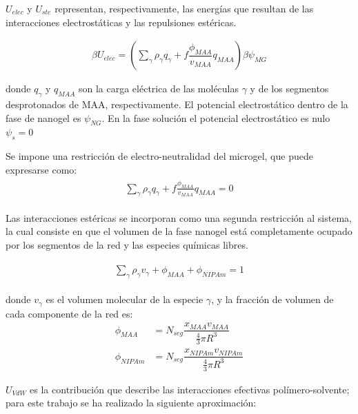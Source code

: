 	
	$U_{elec}$ y $U_{ste}$ representan, respectivamente, las energ\'ias que resultan de las interacciones electrost\'aticas y las repulsiones est\'ericas.
	
	\begin{align}
		\beta U_{elec} =\left(\sum_{\gamma } {\rho_\gamma q_\gamma + f\dfrac{\phi_{MAA}}{v_{MAA}}q_{MAA}}\right)\beta\psi_{MG}
	\end{align}
	
	\noindent donde $q_\gamma$ y $q_{MAA}$ son la carga el\'ectrica de las moléculas $\gamma$ y de los segmentos desprotonados de MAA, respectivamente.
	El potencial electrost\'atico dentro de la fase de nanogel es $\psi_{NG}$. En la fase soluci\'on el potencial electrost\'atico es nulo $\psi_s = 0$
	
	Se impone una restricci\'on de electro-neutralidad del microgel, que puede expresarse como:
	\begin{align}
		\begin{aligned}
			\sum_{\gamma  } \rho_\gamma q_\gamma + f\frac{\phi_{MAA}}{v_{MAA}}q_{MAA}=0
		\end{aligned}
		\label{eq:mc:charge-neutrality}
	\end{align}
	
	Las interacciones est\'ericas se incorporan como una segunda restricci\'on al sistema, la cual consiste en que el volumen de la fase nanogel est\'a completamente ocupado por los segmentos de la red y las especies qu\'imicas libres.
	
	\begin{align}
		\begin{aligned}
			\sum_{\gamma } \rho_\gamma v_\gamma  + \phi_{MAA} + \phi_{NIPAm} = 1
		\end{aligned}
		\label{eq:mc:packing}
	\end{align}
	
	
	\noindent donde $v_\gamma$  es el volumen molecular de la especie $\gamma$, y la fracci\'on de volumen de cada componente de la red es: 
	\begin{align}
		\phi_{MAA}&=N_{seg}\dfrac{x_{MAA}v_{MAA}}{\frac{4}{3}\pi R^3}\\
		\phi_{NIPAm}&=N_{seg}\dfrac{x_{NIPAm}v_{NIPAm}}{\frac{4}{3}\pi R^3}
	\end{align}
	
	
	
	$U_{VdW}$ es la contribuci\'on que describe las interacciones efectivas pol\'imero-solvente; para este trabajo  se ha realizado la siguiente aproximaci\'on: 
	
